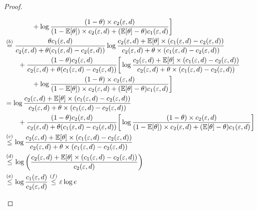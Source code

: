 \begin{proof}
\begin{enumerate}
\begin{align}
    &  \qquad \qquad + \log \dfrac{(1-\theta) \times c_2(\varepsilon,d)}{ (1-\Expectation[\theta]) \times c_2(\varepsilon,d) + (\Expectation[\theta] - \theta) c_1(\varepsilon,d)} \bigg] \\
    & \stackrel{(b)}{=} \dfrac{\theta c_1(\varepsilon,d)}{c_2(\varepsilon,d) +  \theta (c_1(\varepsilon,d) - c_2(\varepsilon,d))} \log \dfrac{c_2(\varepsilon,d) + \Expectation[\theta] \times (c_1(\varepsilon,d) - c_2(\varepsilon,d))}{c_2(\varepsilon,d) +  \theta \times (c_1(\varepsilon,d) - c_2(\varepsilon,d))} \\ 
    & \qquad + \dfrac{(1-\theta)c_2(\varepsilon,d)}{c_2(\varepsilon,d) +  \theta (c_1(\varepsilon,d) - c_2(\varepsilon,d))} \bigg[ \log \dfrac{c_2(\varepsilon,d)+ \Expectation[\theta] \times (c_1(\varepsilon,d) - c_2(\varepsilon,d))}{c_2(\varepsilon,d) +  \theta \times (c_1(\varepsilon,d) - c_2(\varepsilon,d))} \\
    &  \qquad \qquad + \log \dfrac{(1-\theta) \times c_2(\varepsilon,d)}{ (1-\Expectation[\theta]) \times c_2(\varepsilon,d) + (\Expectation[\theta] - \theta) c_1(\varepsilon,d)} \bigg]  \\
    & = \log \dfrac{c_2(\varepsilon,d) + \Expectation[\theta] \times (c_1(\varepsilon,d) - c_2(\varepsilon,d))}{c_2(\varepsilon,d) +  \theta \times (c_1(\varepsilon,d) - c_2(\varepsilon,d))} \\
    &  \qquad + \dfrac{(1-\theta)c_2(\varepsilon,d)}{c_2(\varepsilon,d) +  \theta (c_1(\varepsilon,d) - c_2(\varepsilon,d))} \bigg[ \log \dfrac{(1-\theta) \times c_2(\varepsilon,d)}{ (1-\Expectation[\theta]) \times c_2(\varepsilon,d) + (\Expectation[\theta] - \theta) c_1(\varepsilon,d)} \bigg]  \\
    & \stackrel{(c)}{\leq} \log \dfrac{c_2(\varepsilon,d) + \Expectation[\theta] \times (c_1(\varepsilon,d) - c_2(\varepsilon,d))}{c_2(\varepsilon,d) +  \theta \times (c_1(\varepsilon,d) - c_2(\varepsilon,d))} \\ & \stackrel{(d)}{\leq}  \log \bigg( \frac{c_2(\varepsilon,d) + \Expectation[\theta] \times (c_1(\varepsilon,d) - c_2(\varepsilon,d))}{c_2(\varepsilon,d)} \bigg) \label{eq:KL_1} \\
    & \stackrel{(e)}{\leq} \log \frac{c_1(\varepsilon,d)}{c_2(\varepsilon,d)}  \stackrel{(f)}{\leq} \varepsilon \log e

\end{align}
\end{enumerate}
\end{proof}
